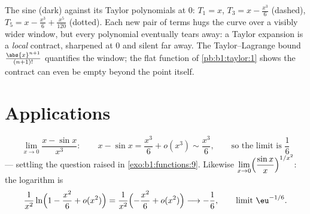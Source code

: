 \begin{omfigure}

{\small The sine (dark) against its Taylor polynomials at $0$:
$T_1 = x$, $T_3 = x - \frac{x^3}{6}$ (dashed), $T_5 = x -
\frac{x^3}{6} + \frac{x^5}{120}$ (dotted). Each new pair of terms
hugs the curve over a visibly wider window, but every polynomial
eventually tears away: a Taylor expansion is a \emph{local}
contract, sharpened at $0$ and silent far away. The
Taylor--Lagrange bound $\frac{\abs{x}^{n+1}}{(n+1)!}$ quantifies
the window; the flat function of \cref{pb:b1:taylor:1} shows the
contract can even be empty beyond the point itself.}
\end{omfigure}

\section{Applications}

\begin{example}[Limits]\label{ex:b1:taylor:limits}
\[
\lim_{x \to 0} \frac{x - \sin x}{x^3}:
\qquad
x - \sin x = \frac{x^3}{6} + o(x^3) \sim \frac{x^3}{6},
\qquad\text{so the limit is } \frac16
\]
--- settling the question raised in \cref{exo:b1:functions:9}.
Likewise $\displaystyle\lim_{x\to0}\Bigl(\frac{\sin
x}{x}\Bigr)^{1/x^2}$: the logarithm is
\[
\frac{1}{x^2}\ln\Bigl(1 - \frac{x^2}{6} + o(x^2)\Bigr)
= \frac{1}{x^2}\Bigl(-\frac{x^2}{6} + o(x^2)\Bigr)
\longrightarrow -\frac16,
\qquad\text{limit } \eu^{-1/6}.
\]
\end{example}

